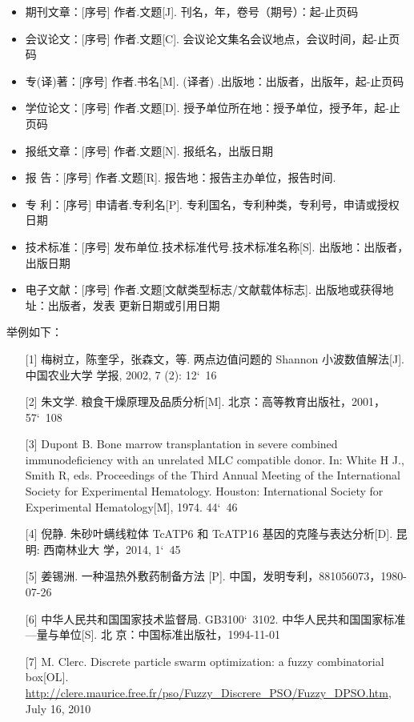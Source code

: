 \begin{itemize}
\item 期刊文章：[序号] 作者.文题[J]. 刊名，年，卷号（期号）：起-止页码
\item 会议论文：[序号] 作者.文题[C]. 会议论文集名会议地点，会议时间，起-止页码
\item 专(译)著：[序号] 作者.书名[M]. (译者) .出版地：出版者，出版年，起-止页码
\item 学位论文：[序号] 作者.文题[D]. 授予单位所在地：授予单位，授予年，起-止页码
\item 报纸文章：[序号] 作者.文题[N]. 报纸名，出版日期
\item 报 告：[序号] 作者.文题[R]. 报告地：报告主办单位，报告时间.
\item 专 利：[序号] 申请者.专利名[P]. 专利国名，专利种类，专利号，申请或授权日期
\item 技术标准：[序号] 发布单位.技术标准代号.技术标准名称[S]. 出版地：出版者，出版日期
\item 电子文献：[序号] 作者.文题[文献类型标志/文献载体标志]. 出版地或获得地址：出版者，发表
  更新日期或引用日期
\end{itemize}
\medskip%
举例如下：
\begin{itemize}
\item[] [1] 梅树立，陈奎孚，张森文，等. 两点边值问题的 Shannon 小波数值解法[J]. 中国农业大学
  学报, 2002, 7 (2): 12\char`~{}16
\item[] [2] 朱文学. 粮食干燥原理及品质分析[M]. 北京：高等教育出版社，2001，57\char`~{}108
\item[] [3] Dupont B. Bone marrow transplantation in severe combined immunodeficiency with
  an unrelated MLC compatible donor. In: White H J., Smith R, eds. Proceedings of the
  Third Annual Meeting of the International Society for Experimental Hematology.
  Houston: International Society for Experimental Hematology[M], 1974. 44\char`~{}46
\item[] [4] 倪静. 朱砂叶螨线粒体 TcATP6 和 TcATP16 基因的克隆与表达分析[D]. 昆明: 西南林业大
  学，2014, 1\char`~{}45
\item[] [5] 姜锡洲. 一种温热外敷药制备方法 [P]. 中国，发明专利，881056073，1980-07-26
\item[] [6] 中华人民共和国国家技术监督局. GB3100\char`~{}3102. 中华人民共和国国家标准—量与单位[S]. 北
  京：中国标准出版社，1994-11-01
\item[] [7] M. Clerc. Discrete particle swarm optimization: a fuzzy combinatorial
  box[OL]. \url{http://clere.maurice.free.fr/pso/Fuzzy_Discrere_PSO/Fuzzy_DPSO.htm},
  July 16, 2010
\end{itemize}


